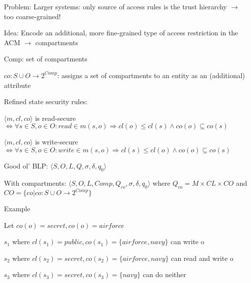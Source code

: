 \documentclass[a4paper]{article}
\begin{document}
\begin{multicols}{3}
    Problem: Larger systems: only source of access rules is the trust hierarchy $\rightarrow$ too coarse-grained!

    Idea: Encode an additional, more fine-grained type of access restriction in the ACM $\rightarrow$ compartments
    \begin{itemize*}
        \item Comp: set of compartments
        \item $co:S\cup O\rightarrow 2^{Comp}$: assigns a set of compartments to an entity as an (additional) attribute
        \item Refined state security rules:
              \begin{itemize*}
                  \item $⟨m,cl,co⟩$ is read-secure $\Leftrightarrow\forall s\in S,o\in O:read \in m(s,o)\Rightarrow cl(o)\leq cl(s)\wedge co(o) \subseteq co(s)$
                  \item $⟨m,cl,co⟩$ is write-secure $\Leftrightarrow\forall s\in S,o\in O:write\in m(s,o)\Rightarrow cl(s)\leq cl(o)\wedge co(o) \subseteq co(s)$
                  \item Good ol’ BLP: $⟨S,O,L,Q,\sigma,\delta,q_0⟩$
                  \item With compartments: $⟨S,O,L,Comp,Q_{co},\sigma,\delta,q_0⟩$ where $Q_{co}=M\times CL\times CO$ and $CO=\{co|co:S\cup O\rightarrow 2^{Comp}\}$
              \end{itemize*}
    \end{itemize*}

    Example
    \begin{itemize*}
        \item Let $co(o)=secret,co(o)=airforce$
        \item $s_1$ where $cl(s_1)=public,co(s_1)=\{airforce,navy\}$ can write o
        \item $s_2$ where $cl(s_2)=secret,co(s_2)=\{airforce,navy\}$ can read and write o
        \item $s_3$ where $cl(s_3)=secret,co(s_3)=\{navy\}$ can do neither
        \item %
    \end{itemize*}



\end{multicols}
\end{document}
